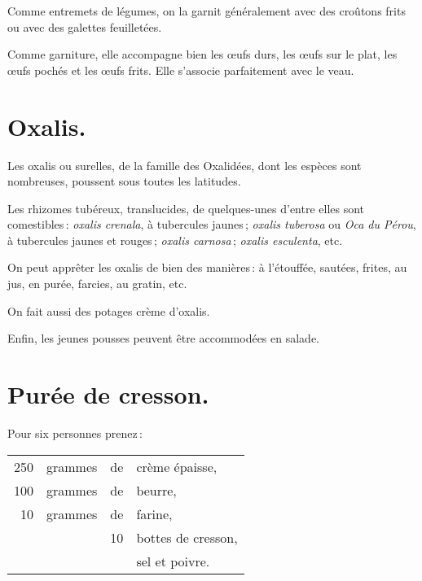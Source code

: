 \medskip

Comme entremets de légumes, on la garnit généralement avec des croûtons frits
ou avec des galettes feuilletées.

\medskip

Comme garniture, elle accompagne bien les œufs durs, les œufs sur le plat, les
œufs pochés et les œufs frits. Elle s'associe parfaitement avec le veau.

\section*{\centering Oxalis.}
{}

Les oxalis ou surelles, de la famille des Oxalidées, dont les espèces sont
nombreuses, poussent sous toutes les latitudes.

Les rhizomes tubéreux, translucides, de quelques-unes d'entre elles sont
comestibles : \textit{oxalis crenala}, à tubercules jaunes ; \textit{oxalis
tuberosa} ou \textit{Oca du Pérou}, à tubercules jaunes et rouges ;
\textit{oxalis carnosa} ; \textit{oxalis esculenta}, etc.

\medskip

On peut apprêter les oxalis de bien des manières : à l'étouffée, sautées,
frites, au jus, en purée, farcies, au gratin, etc.

On fait aussi des potages crème d'oxalis.

Enfin, les jeunes pousses peuvent être accommodées en salade.

\section*{\centering Purée de cresson.}
{}

Pour six personnes prenez :

\footnotesize
\begin{longtable}{rrrp{16em}}
    250 & grammes & de & crème épaisse,                                                                   \\
    100 & grammes & de & beurre,                                                                          \\
     10 & grammes & de & farine,                                                                          \\
        &         & 10 & bottes de cresson,                                                               \\
        &         &    & sel et poivre.                                                                   \\
\end{longtable}
\normalsize

